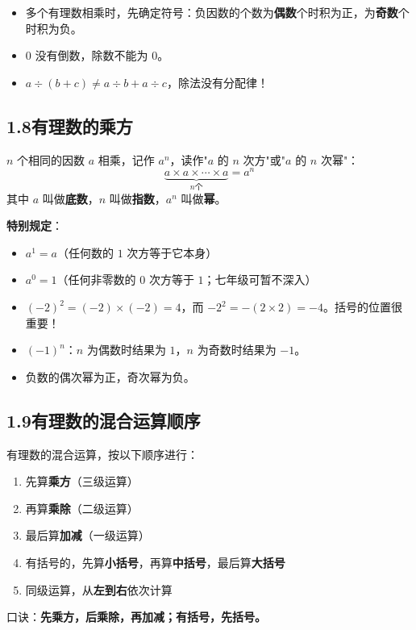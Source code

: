 \documentclass[12pt, a4paper]{ctexart}
\begin{document}
\begin{warnbox}[易错提醒]
\begin{itemize}[leftmargin=*]
  \item 多个有理数相乘时，先确定符号：负因数的个数为\textbf{偶数}个时积为正，为\textbf{奇数}个时积为负。
  \item $0$ 没有倒数，除数不能为 $0$。
  \item $a \div (b + c) \neq a \div b + a \div c$，除法没有分配律！
\end{itemize}
\end{warnbox}

\subsection*{1.8\quad 有理数的乘方}

\begin{knowledgebox}[乘方的定义]
$n$ 个相同的因数 $a$ 相乘，记作 $a^n$，读作"$a$ 的 $n$ 次方"或"$a$ 的 $n$ 次幂"：
\[
\underbrace{a \times a \times \cdots \times a}_{n\text{个}} = a^n
\]
其中 $a$ 叫做\textbf{底数}，$n$ 叫做\textbf{指数}，$a^n$ 叫做\textbf{幂}。

\textbf{特别规定}：
\begin{itemize}[leftmargin=*]
  \item $a^1 = a$（任何数的 $1$ 次方等于它本身）
  \item $a^0 = 1$（任何非零数的 $0$ 次方等于 $1$；七年级可暂不深入）
\end{itemize}
\end{knowledgebox}

\begin{warnbox}[易错提醒]
\begin{itemize}[leftmargin=*]
  \item $(-2)^2 = (-2) \times (-2) = 4$，而 $-2^2 = -(2 \times 2) = -4$。括号的位置很重要！
  \item $(-1)^n$：$n$ 为偶数时结果为 $1$，$n$ 为奇数时结果为 $-1$。
  \item 负数的偶次幂为正，奇次幂为负。
\end{itemize}
\end{warnbox}

\subsection*{1.9\quad 有理数的混合运算顺序}

\begin{knowledgebox}[混合运算顺序]
有理数的混合运算，按以下顺序进行：
\begin{enumerate}[leftmargin=*]
  \item 先算\textbf{乘方}（三级运算）
  \item 再算\textbf{乘除}（二级运算）
  \item 最后算\textbf{加减}（一级运算）
  \item 有括号的，先算\textbf{小括号}，再算\textbf{中括号}，最后算\textbf{大括号}
  \item 同级运算，从\textbf{左到右}依次计算
\end{enumerate}

口诀：\textbf{先乘方，后乘除，再加减；有括号，先括号。}
\end{knowledgebox}
\end{document}
